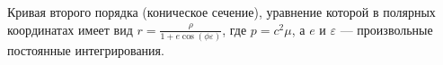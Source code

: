 Кривая второго порядка (коническое сечение), уравнение которой в полярных координатах имеет вид $r=\frac{\rho}{1+e\cos(\phi\varepsilon)}$, где $p=c^2\mu$, а $e$ и $\varepsilon$ --- произвольные постоянные интегрирования.
